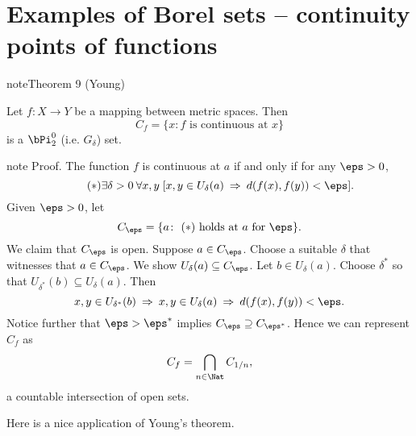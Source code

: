 \documentclass[letterpaper,10pt,english]{jupyterBook}
\begin{document}
\section{Examples of Borel sets – continuity points of functions}
\label{\detokenize{Borel:examples-of-borel-sets-continuity-points-of-functions}}\label{Borel:thm-Young}
\begin{sphinxadmonition}{note}{Theorem 9 (Young)}



\sphinxAtStartPar
Let \(f: X \to Y\) be a mapping between metric spaces. Then
\begin{equation*}
    C_f = \{ x \colon f \text{ is continuous at $x$} \}
\end{equation*}
\sphinxAtStartPar
is a \(\bPi^0_2\) (i.e. \(G_\delta\)) set.
\end{sphinxadmonition}

\begin{sphinxadmonition}{note}
\sphinxAtStartPar
Proof. The function \(f\) is continuous at \(a\) if and only if for any \(\eps > 0\),
\begin{equation*} \tag{$*$}
        \exists \delta > 0 \: \forall x,y \; [ x,y \in U_\delta(a) \: \Rightarrow \: d(f(x),f(y)) < \eps  ].
\end{equation*}
\sphinxAtStartPar
Given \(\eps > 0\), let
\begin{equation*}
    C_\eps = \{ a \colon \text{ ($*$) holds at $a$ for $\eps$} \}. 
\end{equation*}
\sphinxAtStartPar
We claim that \(C_\eps\) is open. Suppose \(a \in C_\eps\). Choose a suitable \(\delta\) that witnesses that \(a \in C_\eps\). We show \(U_\delta(a) \subseteq C_\eps\). Let \(b \in U_\delta(a)\). Choose \(\delta^*\) so that \(U_{\delta^*}(b) \subseteq U_\delta(a)\). Then
\begin{equation*}
    x,y \in U_{\delta^*}(b) \: \Rightarrow \: x,y \in U_\delta(a) \: \Rightarrow \: d(f(x),f(y)) < \eps.
\end{equation*}
\sphinxAtStartPar
Notice further that \(\eps > \eps^*\) implies \(C_\eps \supseteq C_{\eps^*}\). Hence we can represent \(C_f\) as
\begin{equation*}
    C_f = \bigcap_{n \in\Nat} C_{1/n},
\end{equation*}
\sphinxAtStartPar
a countable intersection of open sets.
\end{sphinxadmonition}

\sphinxAtStartPar
Here is a nice application of Young’s theorem.
\end{document}
